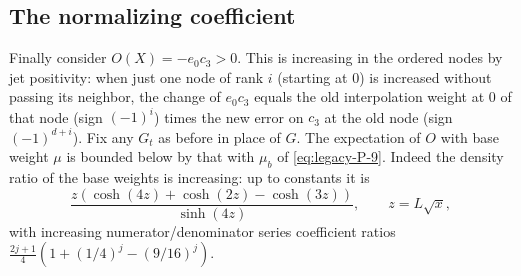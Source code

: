 \subsection{The normalizing coefficient}
Finally consider $O(X)=-e_0 c_3>0$. This is increasing in the ordered nodes by jet positivity: when just one node of rank $i$ (starting at 0) is increased without passing its neighbor, the change of $e_0 c_3$ equals the old interpolation weight at 0 of that node (sign $(-1)^i$) times the new error on $c_3$ at the old node (sign $(-1)^{d+i}$). Fix any $G_t$ as before in place of $G$. The expectation of $O$ with base weight $\mu$ is bounded below by that with $\mu_b$ of \eqref{eq:legacy-P-9}. Indeed the density ratio of the base weights is increasing: up to constants it is
\[
 \frac{z(\cosh(4z)+\cosh(2z)-\cosh(3z))}{\sinh(4z)},\qquad z=L\sqrt{x},
\]
with increasing numerator/denominator series coefficient ratios $\frac{2j+1}{4}(1+(1/4)^j-(9/16)^j)$.

